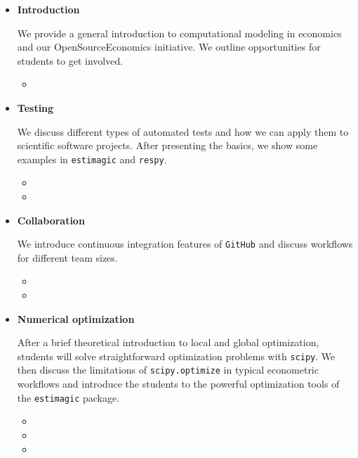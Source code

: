 \begin{itemize}

\item \textbf{Introduction}

We provide a general introduction to computational modeling in economics and our OpenSourceEconomics initiative. We outline opportunities for students to get involved.

\begin{itemize}
  \item {}
\end{itemize}

\item \textbf{Testing}

We discuss different types of automated tests and how we can apply them to scientific software projects. After presenting the basics, we show some examples in \verb+estimagic+ and \verb+respy+.

\begin{itemize}
  \item {}
  \item {}
\end{itemize}


\item \textbf{Collaboration}

We introduce continuous integration features of \verb+GitHub+ and discuss workflows for different team sizes.

\begin{itemize}
  \item {}
  \item {}
\end{itemize}

\item \textbf{Numerical optimization}

After a brief theoretical introduction to local and global optimization, students will solve straightforward optimization problems with \verb+scipy+. We then discuss the limitations of \verb+scipy.optimize+ in typical econometric workflows and introduce the students to the powerful optimization tools of the \verb+estimagic+ package.

\begin{itemize}
  \item {}
  \item {}
  \item {}
\end{itemize}


\end{itemize}
